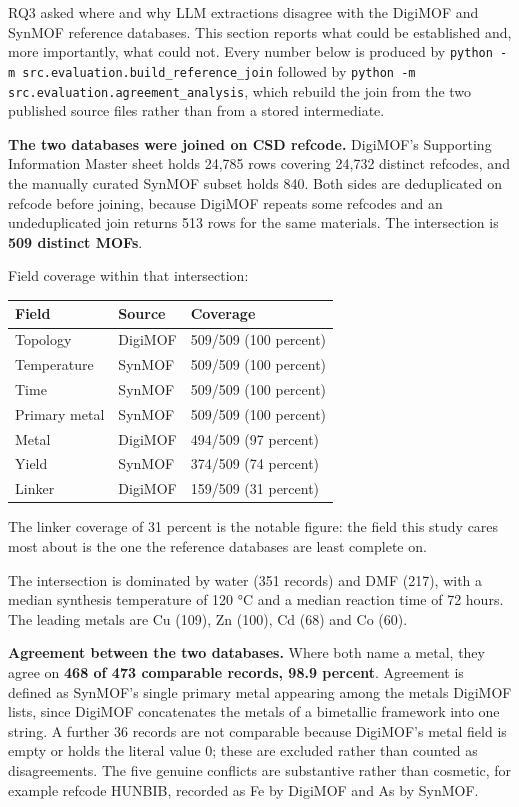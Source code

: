 \documentclass[11pt,a4paper,oneside]{report}
\begin{document}
RQ3 asked where and why LLM extractions disagree with the DigiMOF and SynMOF reference databases. This section reports what could be established and, more importantly, what could not. Every number below is produced by \texttt{python -\allowbreak{}m src.\allowbreak{}evaluation.\allowbreak{}build\_\allowbreak{}reference\_\allowbreak{}join} followed by \texttt{python -\allowbreak{}m src.\allowbreak{}evaluation.\allowbreak{}agreement\_\allowbreak{}analysis}, which rebuild the join from the two published source files rather than from a stored intermediate.

\textbf{The two databases were joined on CSD refcode.} DigiMOF's Supporting Information Master sheet holds 24,785 rows covering 24,732 distinct refcodes, and the manually curated SynMOF subset holds 840. Both sides are deduplicated on refcode before joining, because DigiMOF repeats some refcodes and an undeduplicated join returns 513 rows for the same materials. The intersection is \textbf{509 distinct MOFs}.

Field coverage within that intersection:

\par\medskip
\begingroup
\small\setlength{\tabcolsep}{6pt}
\begin{tabular}{@{}lll@{}}
\toprule
\textbf{Field} & \textbf{Source} & \textbf{Coverage} \\
\midrule
Topology & DigiMOF & 509/509 (100 percent) \\
Temperature & SynMOF & 509/509 (100 percent) \\
Time & SynMOF & 509/509 (100 percent) \\
Primary metal & SynMOF & 509/509 (100 percent) \\
Metal & DigiMOF & 494/509 (97 percent) \\
Yield & SynMOF & 374/509 (74 percent) \\
Linker & DigiMOF & 159/509 (31 percent) \\
\bottomrule
\end{tabular}
\endgroup
\par\medskip
The linker coverage of 31 percent is the notable figure: the field this study cares most about is the one the reference databases are least complete on.

The intersection is dominated by water (351 records) and DMF (217), with a median synthesis temperature of 120 °C and a median reaction time of 72 hours. The leading metals are Cu (109), Zn (100), Cd (68) and Co (60).

\textbf{Agreement between the two databases.} Where both name a metal, they agree on \textbf{468 of 473 comparable records, 98.9 percent}. Agreement is defined as SynMOF's single primary metal appearing among the metals DigiMOF lists, since DigiMOF concatenates the metals of a bimetallic framework into one string. A further 36 records are not comparable because DigiMOF's metal field is empty or holds the literal value 0; these are excluded rather than counted as disagreements. The five genuine conflicts are substantive rather than cosmetic, for example refcode HUNBIB, recorded as Fe by DigiMOF and As by SynMOF.
\end{document}
